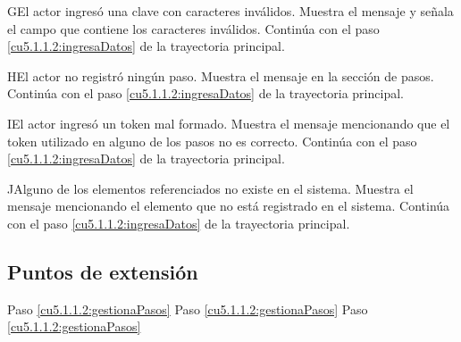  \begin{UCtrayectoriaA}{G}{El actor ingresó una clave con caracteres inválidos.}
    \UCpaso[\UCsist] Muestra el mensaje  y señala el campo que contiene los caracteres inválidos.
    \UCpaso[] Continúa con el paso \ref{cu5.1.1.2:ingresaDatos} de la trayectoria principal.
 \end{UCtrayectoriaA}
 \begin{UCtrayectoriaA}{H}{El actor no registró ningún paso.}
    \UCpaso[\UCsist] Muestra el mensaje  en la sección de pasos.
    \UCpaso[] Continúa con el paso \ref{cu5.1.1.2:ingresaDatos} de la trayectoria principal.
 \end{UCtrayectoriaA}
 \begin{UCtrayectoriaA}{I}{El actor ingresó un token mal formado.}
    \UCpaso[\UCsist] Muestra el mensaje  mencionando que el token utilizado en alguno de los pasos no es correcto.
    \UCpaso[] Continúa con el paso \ref{cu5.1.1.2:ingresaDatos} de la trayectoria principal.
 \end{UCtrayectoriaA}
 \begin{UCtrayectoriaA}{J}{Alguno de los elementos referenciados no existe en el sistema.}
    \UCpaso[\UCsist] Muestra el mensaje  mencionando el elemento que no está registrado en el sistema.
    \UCpaso[] Continúa con el paso \ref{cu5.1.1.2:ingresaDatos} de la trayectoria principal.
 \end{UCtrayectoriaA}

\subsection{Puntos de extensión}

	{Paso \ref{cu5.1.1.2:gestionaPasos}}
	{}
	{Paso \ref{cu5.1.1.2:gestionaPasos}}
	{}	
	{Paso \ref{cu5.1.1.2:gestionaPasos}}
	{}
  